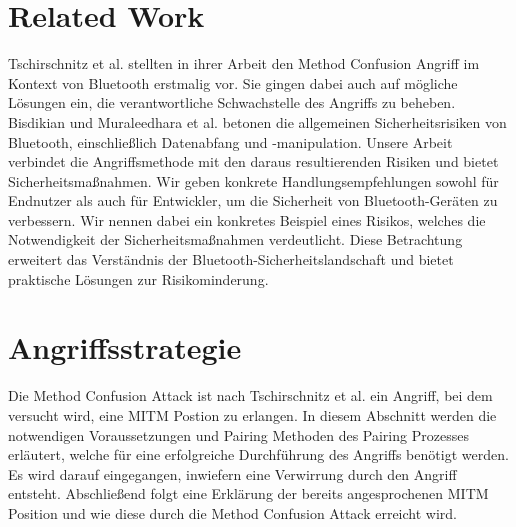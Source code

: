 \documentclass[
    a4paper,
    pagesize,
    pdftex,
    12pt,
]{scrartcl}
\begin{document}
    \section{Related Work}
    Tschirschnitz et al. \cite{method_confusion_attack} stellten in ihrer Arbeit den Method Confusion Angriff im Kontext von Bluetooth erstmalig vor. Sie gingen dabei auch auf mögliche Lösungen ein, die verantwortliche Schwachstelle des Angriffs zu beheben.
    Bisdikian und Muraleedhara et al. \cite{bluetooth_newest_security_risks} betonen die allgemeinen Sicherheitsrisiken von Bluetooth, einschließlich Datenabfang und -manipulation.
    Unsere Arbeit verbindet die Angriffsmethode mit den daraus resultierenden Risiken und bietet Sicherheitsmaßnahmen. Wir geben konkrete Handlungsempfehlungen sowohl für Endnutzer als auch für Entwickler, um die Sicherheit von Bluetooth-Geräten zu verbessern. Wir nennen dabei ein konkretes Beispiel eines Risikos, welches die Notwendigkeit der Sicherheitsmaßnahmen verdeutlicht.
    Diese Betrachtung erweitert das Verständnis der Bluetooth-Sicherheitslandschaft und bietet praktische Lösungen zur Risikominderung.

    \newpage



    \section{Angriffsstrategie}
    Die Method Confusion Attack ist nach Tschirschnitz et al. \cite{method_confusion_attack} ein Angriff, bei dem versucht wird, eine MITM Postion zu erlangen. In diesem Abschnitt werden die notwendigen Voraussetzungen und Pairing Methoden des Pairing Prozesses erläutert, welche für eine erfolgreiche Durchführung des Angriffs benötigt werden. Es wird darauf eingegangen, inwiefern eine Verwirrung durch den Angriff entsteht. Abschließend folgt eine Erklärung der bereits angesprochenen MITM Position und wie diese durch die Method Confusion Attack erreicht wird.
\end{document}
